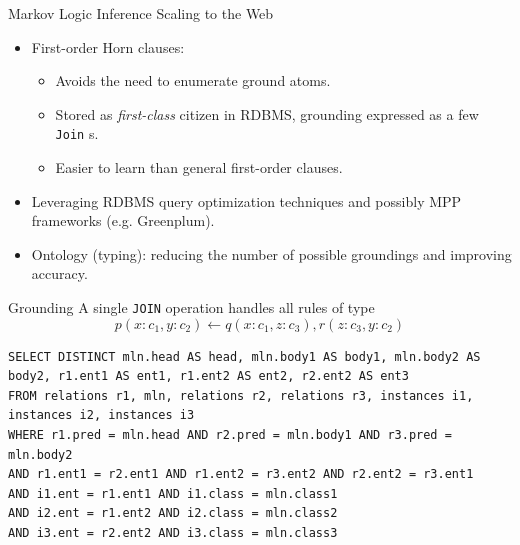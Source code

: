\documentclass[onlymath,xcolor=pdftex,dvipsnames,table]{beamer}
\let\oldemph\emph
\renewcommand{\emph}[1]{{\color{Blue}\oldemph{#1}}}
\newcommand{\stt}[1]{\texttt{\small #1}\xspace}
\newcommand{\head}[1]{{\large\color{OliveGreen}#1\\[2pt]}}
\begin{document}
\begin{frame}{Markov Logic Inference}
\head{Scaling to the Web}
\begin{itemize}
  \item First-order Horn clauses:
  \begin{itemize}
    \item Avoids the need to enumerate ground atoms.
    \item Stored as \emph{first-class} citizen in RDBMS, grounding expressed as a few \stt{Join}s.
    \item Easier to learn than general first-order clauses.
  \end{itemize}
  \item Leveraging RDBMS query optimization techniques and possibly MPP frameworks (e.g. Greenplum).
  \item Ontology (typing): reducing the number of possible groundings and improving accuracy.
\end{itemize}
\end{frame}

\begin{frame}[fragile]{Grounding}
A single \stt{JOIN} operation handles all rules of type
$$
p(x: c_1, y: c_2)\leftarrow q(x: c_1, z: c_3), r(z: c_3, y: c_2)
$$
\begin{lstlisting}
SELECT DISTINCT mln.head AS head, mln.body1 AS body1, mln.body2 AS body2, r1.ent1 AS ent1, r1.ent2 AS ent2, r2.ent2 AS ent3
FROM relations r1, mln, relations r2, relations r3, instances i1, instances i2, instances i3
WHERE r1.pred = mln.head AND r2.pred = mln.body1 AND r3.pred = mln.body2
AND r1.ent1 = r2.ent1 AND r1.ent2 = r3.ent2 AND r2.ent2 = r3.ent1
AND i1.ent = r1.ent1 AND i1.class = mln.class1
AND i2.ent = r1.ent2 AND i2.class = mln.class2
AND i3.ent = r2.ent2 AND i3.class = mln.class3
\end{lstlisting}
\end{frame}
\end{document}
